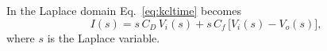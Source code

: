 \documentclass[11pt,a4paper]{article}
\newcommand{\dd}{\mathrm{d}}
\newcommand{\CD}{\ensuremath{C_D}}
\newcommand{\Cf}{\ensuremath{C_f}}
\begin{document}
In the Laplace domain
Eq.~\eqref{eq:kcltime} becomes
%
\begin{equation}
 I(s) = s\,\CD\,V_i(s) + s\,\Cf\,\big[V_i(s)-V_o(s)\big],
\label{eq:kcls}
\end{equation}
%
where $s$ is the Laplace variable.
\end{document}
